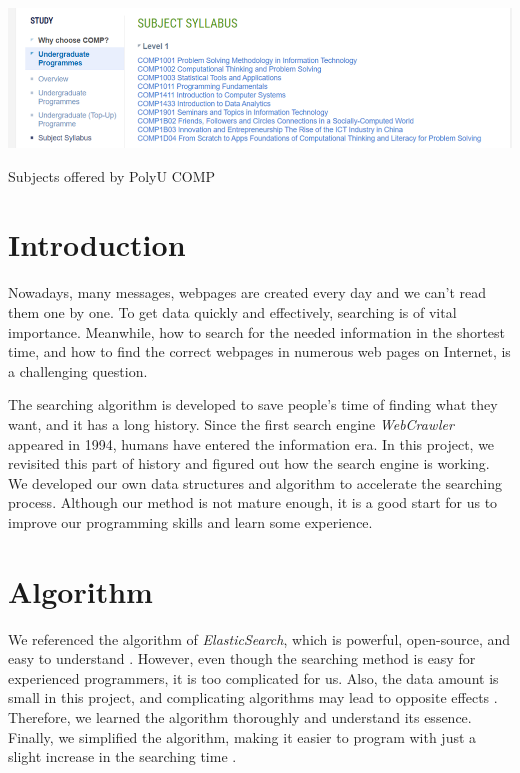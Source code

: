 \documentclass[manuscript,screen,review,12pt]{acmart}
\begin{document}
\begin{teaserfigure}
  \includegraphics[width=\textwidth]{teaser}
  \caption{Subjects offered by PolyU COMP}
  \label{fig:teaser}
\end{teaserfigure}

\maketitle

\section{Introduction}
Nowadays, many messages, webpages are created every day and we can't read them one by one. To get data quickly and effectively, searching is of vital importance. Meanwhile, how to search for the needed information in the shortest time, and how to find the correct webpages in numerous web pages on Internet, is a challenging question.

The searching algorithm is developed to save people's time of finding what they want, and it has a long history. Since the first search engine \textit{WebCrawler} appeared in 1994, humans have entered the information era. In this project, we revisited this part of history and figured out how the search engine is working. We developed our own data structures and algorithm to accelerate the searching process. Although our method is not mature enough, it is a good start for us to improve our programming skills and learn some experience.

\section{Algorithm}
We referenced the algorithm of \textit{ElasticSearch}, which is powerful, open-source, and easy to understand \cite{gormley2015elasticsearch}. However, even though the searching method is easy for experienced programmers, it is too complicated for us. Also, the data amount is small in this project, and complicating algorithms may lead to opposite effects \cite{divya2013elasticsearch,hogan2014fast}. Therefore, we learned the algorithm thoroughly and understand its essence. Finally, we simplified the algorithm, making it easier to program with just a slight increase in the searching time \cite{moschovakis2001algorithm}.
\end{document}

